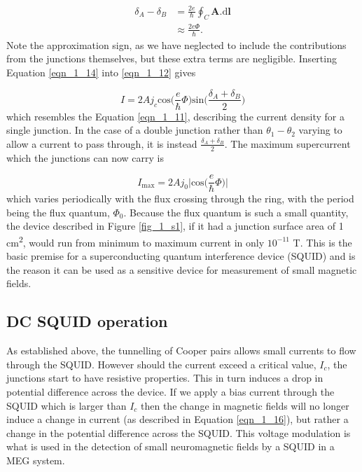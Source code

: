 \begin{equation}
\begin{aligned}
\delta_A - \delta_B &= \frac{2e}{\hbar}\oint_C\mathbf{A}.\text{d}\mathbf{l} \\
&\approx  \frac{2e\Phi}{\hbar}. \label{eqn_1_14}
\end{aligned}
\end{equation} Note the approximation sign, as we have neglected to include the contributions from the junctions themselves, but these extra terms are negligible. Inserting Equation \ref{eqn_1_14} into \ref{eqn_1_12} gives

\begin{equation}
I=2Aj_c\text{cos}\Bigg(\frac{e}{\hbar}\Phi\Bigg)\text{sin}\Bigg(\frac{\delta_A+\delta_B}{2}\Bigg)
\end{equation} which resembles the Equation \ref{eqn_1_11}, describing the current density for a single junction. In the case of a double junction rather than $\theta_1 - \theta_2$ varying to allow a current to pass through, it is instead $\frac{\delta_A+\delta_B}{2}$. The maximum supercurrent which the junctions can now carry is

\begin{equation}
I_{\text{max}} = 2Aj_0\Bigg|\text{cos}\Bigg(\frac{e}{\hbar}\Phi\Bigg)\Bigg| \label{eqn_1_16}
\end{equation} which varies periodically with the flux crossing through the ring, with the period being the flux quantum, $\Phi_0$. Because the flux quantum is such a small quantity, the device described in Figure \ref{fig_1_s1}, if it had a junction surface area of 1 cm\textsuperscript{2}, would run from minimum to maximum current in only $10^{-11}$ T. This is the basic premise for a superconducting quantum interference device (SQUID) and is the reason it can be used as a sensitive device for measurement of small magnetic fields. 

\subsection{DC SQUID operation}

As established above, the tunnelling of Cooper pairs allows small currents to flow through the SQUID. However should the current exceed a critical value, $I_c$, the junctions start to have resistive properties. This in turn induces a drop in potential difference across the device. If we apply a bias current through the SQUID which is larger than $I_c$ then the change in magnetic fields will no longer induce a change in current (as described in Equation \ref{eqn_1_16}), but rather a change in the potential difference across the SQUID. This voltage modulation is what is used in the detection of small neuromagnetic fields by a SQUID in a MEG system. 

